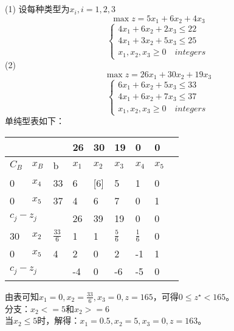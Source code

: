 \documentclass{article}
\begin{document}
\section{}
\noindent
(1)
设每种类型为$x_i,i=1,2,3$
\[\max z=5x_1+6x_2+4x_3\]
\begin{equation*}
    \left\{
        \begin{array}{l}
            4x_1+6x_2+2x_3 \leq 22 \\
            4x_1+3x_2+5x_3 \leq 25 \\
            x_1,x_2,x_3 \geq 0 \quad integers
        \end{array}
        \right.
\end{equation*}
(2)
\[\max z=26x_1+30x_2+19x_3\]
\begin{equation*}
    \left\{
        \begin{array}{l}
            6x_1+6x_2+5x_3 \leq 33 \\
            4x_1+6x_2+7x_3 \leq 37 \\
            x_1,x_2,x_3 \geq 0 \quad integers
        \end{array}
        \right.
\end{equation*}
单纯型表如下：
\begin{table}[h]
    \centering
    \begin{tabular}{l|l|l|lllll|l}
    \hline
    \multicolumn{3}{l|}{} & 26 & 30 & 19 & 0  & 0 &  \\ \hline
    $C_B$  & $x_B$& b     & $x_1$ & $x_2$ & $x_3$  & $x_4$ & $x_5$ &  \\ \hline
    0      & $x_4$& 33    & 6  & [6]& 5  & 1  & 0 &  \\
    0      & $x_5$& 37    & 4  & 6  & 7  & 0  & 1 &  \\ \hline
    \multicolumn{3}{l|}{$c_j-z_j$} & 26 & 39 & 19 & 0  & 0 &  \\ \hline
    30     & $x_2$& $\frac{33}{6}$&1&1&$\frac{5}{6}$&$\frac{1}{6}$&0&  \\
    0      & $x_5$& 4     & 2  & 0  & 2  & -1 & 1 &  \\ \hline
    \multicolumn{3}{l|}{$c_j-z_j$} & -4 & 0  & -6 & -5 & 0 &  \\ \hline
    \end{tabular}
    \end{table}
由表可知$x_1=0,x_2=\frac{33}{6},x_3=0,z=165$，可得$0 \leq z^{\star} <165$。\\
分支：$x_2<=5$和$x_2>=6$\\
当$x_2\leq 5$时，解得：$x_1=0.5,x_2=5,x_3=0,z=163$。\\
\end{document}
